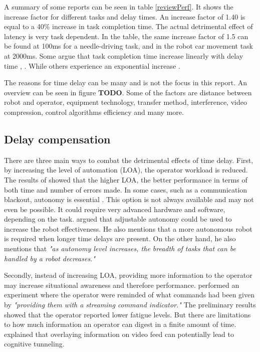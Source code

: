 A summary of some reports can be seen in table \ref{reviewPerf}. It shows the increase factor for different tasks and delay times. An increase factor of 1.40 is equal to a 40\% increase in task completion time. The actual detrimental effect of latency is very task dependent. In the table, the same increase factor of 1.5 can be found at 100ms for a needle-driving task, and in the robot car movement task at 2000ms.
Some argue that task completion time increase linearly with delay time \citep{Ando1999}, \citep{Lane2002}. While others experience an exponential increase \citep{Xu2014}.



The reasons for time delay can be many and is not the focus in this report. An overview can be seen in figure \textbf{TODO}. Some of the factors are distance between robot and operator, equipment technology, transfer method, interference, video compression, control algorithms efficiency and many more.



\subsection{Delay compensation}

There are three main ways to combat the detrimental effects of time delay. First, by increasing the level of automation (LOA), the operator workload is reduced. The results of \citep{Luck2006} showed that the higher LOA, the better performance in terms of both time and number of errors made. In some cases, such as a communication blackout, autonomy is essential \citep{Dorais1999}. This option is not always available and may not even be possible. It could require very advanced hardware and software, depending on the task. \citep{Goodrich2001} argued that adjustable autonomy could be used to increase the robot effectiveness. He also mentions that a more autonomous robot is required when longer time delays are present. On the other hand, he also mentions that \emph{"as autonomy level increases, the breadth of tasks that can be handled by a robot decreases."}

Secondly, instead of increasing LOA, providing more information to the operator may increase situational awareness and therefore performance. \citep{Miller2005} performed an experiment where the operator were reminded of what commands had been given by \emph{"providing them with a streaming command indicator."} The preliminary results showed that the operator reported lower fatigue levels. But there are limitations to how much information an operator can digest in a finite amount of time. \citep{Chen2007} explained that overlaying information on video feed can potentially lead to cognitive tunneling.

